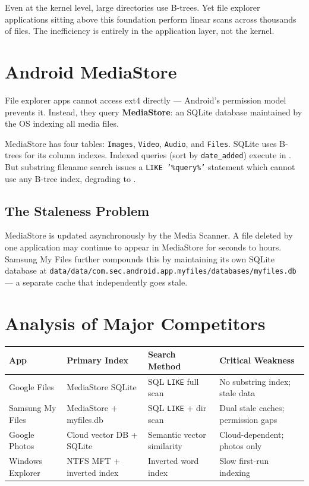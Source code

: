 \begin{insightbox}[title={Critical Observation}]
Even at the kernel level, large directories use B-trees. Yet file explorer applications sitting above this foundation perform linear scans across thousands of files. The inefficiency is entirely in the application layer, not the kernel.
\end{insightbox}

\section{Android MediaStore}

File explorer apps cannot access ext4 directly --- Android's permission model prevents it. Instead, they query \textbf{MediaStore}: an SQLite database maintained by the OS indexing all media files.

MediaStore has four tables: \texttt{Images}, \texttt{Video}, \texttt{Audio}, and \texttt{Files}. SQLite uses B-trees for its column indexes. Indexed queries (sort by \texttt{date\_added}) execute in . But substring filename search issues a \texttt{LIKE '\%query\%'} statement which cannot use any B-tree index, degrading to .

\subsection{The Staleness Problem}

MediaStore is updated asynchronously by the Media Scanner. A file deleted by one application may continue to appear in MediaStore for seconds to hours. Samsung My Files further compounds this by maintaining its own SQLite database at \texttt{data/data/com.sec.android.app.myfiles/databases/myfiles.db} --- a separate cache that independently goes stale.

\section{Analysis of Major Competitors}

\begin{longtable}{@{}p{30mm}p{35mm}p{35mm}p{40mm}@{}}
\toprule
\textbf{App} & \textbf{Primary Index} & \textbf{Search Method} & \textbf{Critical Weakness} \\
\midrule
Google Files & MediaStore SQLite & SQL \texttt{LIKE} full scan & No substring index; stale data \\
Samsung My Files & MediaStore + myfiles.db & SQL \texttt{LIKE} + dir scan & Dual stale caches; permission gaps \\
Google Photos & Cloud vector DB + SQLite & Semantic vector similarity & Cloud-dependent; photos only \\
Windows Explorer & NTFS MFT + inverted index & Inverted word index & Slow first-run indexing \\
\bottomrule
\end{longtable}

